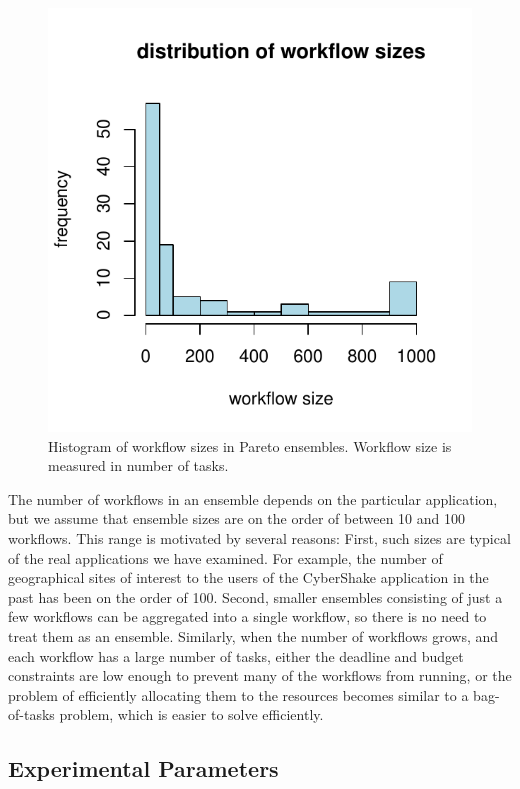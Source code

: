 \documentclass[conference]{IEEEtran}
\begin{document}
\begin{figure}[ht] 
    \centering
    \includegraphics[width=0.6\columnwidth]{figures/ensemble-pareto}
    \caption[Histogram of workflow sizes in Pareto ensembles]{Histogram of workflow sizes in Pareto ensembles. Workflow size is measured in number of tasks.}
    \label{fig:ensemble-pareto}
\end{figure}

The number of workflows in an ensemble depends on the particular application, but we assume that ensemble sizes are on the order of between 10 and 100 workflows. This range is motivated by several reasons: First, such sizes are typical of the real applications we have examined. For example, the number of geographical sites of interest to the users of the CyberShake application in the past has been on the order of 100. Second, smaller ensembles consisting of just a few workflows can be aggregated into a single workflow, so there is no need to treat them as an ensemble. Similarly, when the number of workflows grows, and each workflow has a large number of tasks, either the deadline and budget constraints are low enough to prevent many of the workflows from running, or the problem of efficiently allocating them to the resources becomes similar to a bag-of-tasks problem, which is easier to solve efficiently.


\subsection{Experimental Parameters}
\label{sec:exp-parameters}
\end{document}
